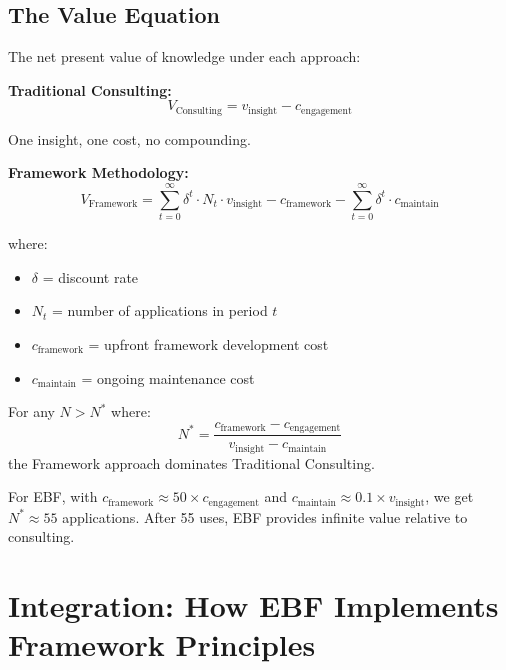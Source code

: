 \subsection{The Value Equation}

The net present value of knowledge under each approach:

\textbf{Traditional Consulting:}
\begin{equation}
V_{\text{Consulting}} = v_{\text{insight}} - c_{\text{engagement}}
\end{equation}

One insight, one cost, no compounding.

\textbf{Framework Methodology:}
\begin{equation}
V_{\text{Framework}} = \sum_{t=0}^{\infty} \delta^t \cdot N_t \cdot v_{\text{insight}} - c_{\text{framework}} - \sum_{t=0}^{\infty} \delta^t \cdot c_{\text{maintain}}
\end{equation}

where:
\begin{itemize}[nosep]
    \item $\delta$ = discount rate
    \item $N_t$ = number of applications in period $t$
    \item $c_{\text{framework}}$ = upfront framework development cost
    \item $c_{\text{maintain}}$ = ongoing maintenance cost
\end{itemize}

\begin{proposition}
For any $N > N^*$ where:
\begin{equation}
N^* = \frac{c_{\text{framework}} - c_{\text{engagement}}}{v_{\text{insight}} - c_{\text{maintain}}}
\end{equation}
the Framework approach dominates Traditional Consulting.
\end{proposition}

For EBF, with $c_{\text{framework}} \approx 50 \times c_{\text{engagement}}$ and $c_{\text{maintain}} \approx 0.1 \times v_{\text{insight}}$, we get $N^* \approx 55$ applications. After 55 uses, EBF provides infinite value relative to consulting.


\section{Integration: How EBF Implements Framework Principles}
\label{sec:fm-integration}

